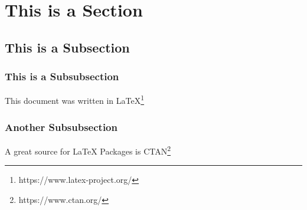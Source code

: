 \section{This is a Section}

\blindtext

\subsection{This is a Subsection}

\subsubsection{This is a Subsubsection}

\blindtext This document was written in LaTeX\footnote{https://www.latex-project.org/}

\subsubsection{Another Subsubsection}

\blindtext A great source for LaTeX Packages is CTAN\footnote{https://www.ctan.org/}